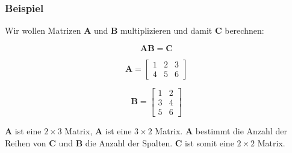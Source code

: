 \subsubsection{Beispiel}

Wir wollen Matrizen $\mathbf{A}$ und $\mathbf{B}$ multiplizieren und damit $\mathbf{C}$ berechnen:

\begin{equation}
\mathbf{AB}  = \mathbf{C}
\end{equation}

\begin{equation}
\mathbf{A}  = \left[\begin{matrix}1 & 2 & 3 \\ 4 & 5 & 6\end{matrix}\right]
\end{equation}

\begin{equation}
\mathbf{B}  = \left[\begin{matrix}1 & 2\\3 & 4\\5 & 6\end{matrix}\right]
\end{equation}


$\mathbf{A}$ ist eine $2 \times 3$ Matrix, $\mathbf{A}$ ist eine $3 \times 2$ Matrix. $\mathbf{A}$ bestimmt die Anzahl der Reihen von $\mathbf{C}$ und $\mathbf{B}$ die Anzahl der Spalten. $\mathbf{C}$ ist somit eine $2 \times 2$ Matrix.




